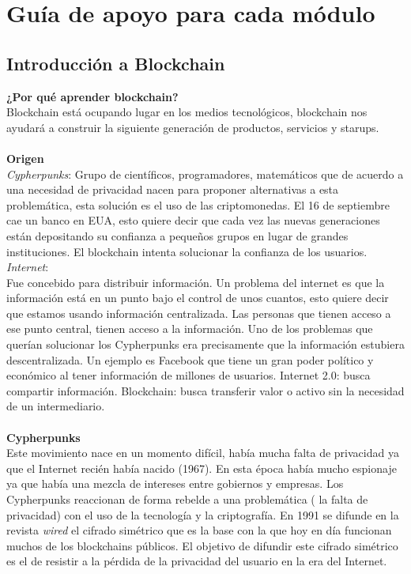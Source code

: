 \documentclass[a4paper,12pt]{/home/armando/Documentos/Cursos/LaTeX/Plantillas/lib/pub}
\begin{document}
\section{Guía de apoyo para cada módulo}
\subsection{Introducción a Blockchain}
\textbf{¿Por qué aprender blockchain?}\\
Blockchain está ocupando lugar en los medios tecnológicos, blockchain nos ayudará a construir la siguiente generación de productos, servicios y starups.\\\\
\textbf{Origen}\\
\textit{Cypherpunks}: Grupo de científicos, programadores, matemáticos que de acuerdo a una necesidad de privacidad nacen para proponer alternativas a esta problemática, esta solución es el uso de las criptomonedas. El 16 de septiembre cae un banco en EUA, esto quiere decir que cada vez las nuevas generaciones están depositando su confianza a pequeños grupos en lugar de grandes instituciones. El blockchain intenta solucionar la confianza de los usuarios.
\textit{Internet}:\\
Fue concebido para distribuir información. Un problema del internet es que la información está en un punto bajo el control de unos cuantos, esto quiere decir que estamos usando información centralizada. Las personas que tienen acceso a ese punto central, tienen acceso a la información. Uno de los problemas que querían solucionar los Cypherpunks era precisamente que la información estubiera descentralizada. Un ejemplo es Facebook que tiene un gran poder político y económico al tener información de millones de usuarios.
Internet 2.0: busca compartir información.
Blockchain: busca transferir valor o activo sin la necesidad de un intermediario.\\\\
\textbf{Cypherpunks}\\
Este movimiento nace en un momento difícil, había mucha falta de privacidad ya que el Internet recién había nacido (1967). En esta época había mucho espionaje ya que había una mezcla de intereses entre gobiernos y empresas.
Los Cypherpunks reaccionan de forma rebelde a una problemática ( la falta de privacidad) con el uso de la tecnología y la criptografía.
En 1991 se difunde en la revista \textit{wired} el cifrado simétrico que es la base con la que hoy en día funcionan muchos de los blockchains públicos. El objetivo de difundir este cifrado simétrico es el de resistir a la pérdida de la privacidad del usuario en la era del Internet.\newpage
\end{document}
